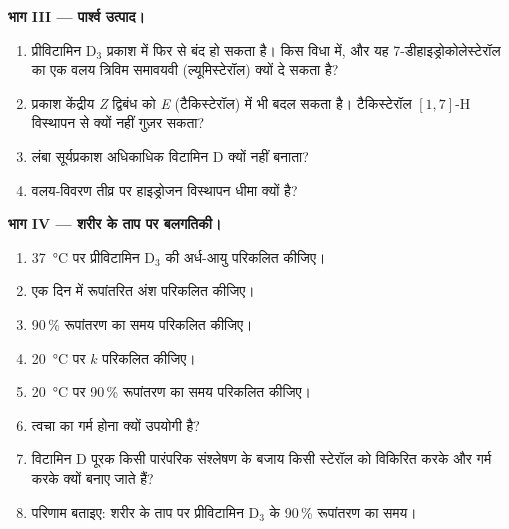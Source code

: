\begin{problem}
\medskip\noindent\textbf{भाग III --- पार्श्व उत्पाद।}
\begin{enumerate}[resume]
  \item प्रीविटामिन D$_3$ प्रकाश में फिर से बंद हो सकता है। किस विधा में, और यह
        7-डीहाइड्रोकोलेस्टेरॉल का एक वलय त्रिविम समावयवी (ल्यूमिस्टेरॉल) क्यों दे सकता है?
  \item प्रकाश केंद्रीय \textit{Z} द्विबंध को \textit{E} (टैकिस्टेरॉल) में भी बदल सकता है।
        टैकिस्टेरॉल $[1,7]$-H विस्थापन से क्यों नहीं गुज़र सकता?
  \item लंबा सूर्यप्रकाश अधिकाधिक विटामिन D क्यों नहीं बनाता?
  \item वलय-विवरण तीव्र पर हाइड्रोजन विस्थापन धीमा क्यों है?
\end{enumerate}

\medskip\noindent\textbf{भाग IV --- शरीर के ताप पर बलगतिकी।}
\begin{enumerate}[resume]
  \item \qty{37}{\celsius} पर प्रीविटामिन D$_3$ की अर्ध-आयु परिकलित कीजिए।
  \item एक दिन में रूपांतरित अंश परिकलित कीजिए।
  \item 90\,\% रूपांतरण का समय परिकलित कीजिए।
  \item \qty{20}{\celsius} पर $k$ परिकलित कीजिए।
  \item \qty{20}{\celsius} पर 90\,\% रूपांतरण का समय परिकलित कीजिए।
  \item त्वचा का गर्म होना क्यों उपयोगी है?
  \item विटामिन D पूरक किसी पारंपरिक संश्लेषण के बजाय किसी स्टेरॉल को विकिरित करके और गर्म करके
        क्यों बनाए जाते हैं?
  \item परिणाम बताइए: शरीर के ताप पर प्रीविटामिन D$_3$ के 90\,\% रूपांतरण का समय।
\end{enumerate}
\end{problem}
